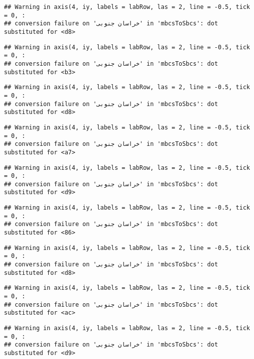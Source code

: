 \documentclass[
]{article}
\begin{document}
\begin{verbatim}
## Warning in axis(4, iy, labels = labRow, las = 2, line = -0.5, tick = 0, :
## conversion failure on 'خراسان جنوبی' in 'mbcsToSbcs': dot substituted for <d8>
\end{verbatim}

\begin{verbatim}
## Warning in axis(4, iy, labels = labRow, las = 2, line = -0.5, tick = 0, :
## conversion failure on 'خراسان جنوبی' in 'mbcsToSbcs': dot substituted for <b3>
\end{verbatim}

\begin{verbatim}
## Warning in axis(4, iy, labels = labRow, las = 2, line = -0.5, tick = 0, :
## conversion failure on 'خراسان جنوبی' in 'mbcsToSbcs': dot substituted for <d8>
\end{verbatim}

\begin{verbatim}
## Warning in axis(4, iy, labels = labRow, las = 2, line = -0.5, tick = 0, :
## conversion failure on 'خراسان جنوبی' in 'mbcsToSbcs': dot substituted for <a7>
\end{verbatim}

\begin{verbatim}
## Warning in axis(4, iy, labels = labRow, las = 2, line = -0.5, tick = 0, :
## conversion failure on 'خراسان جنوبی' in 'mbcsToSbcs': dot substituted for <d9>
\end{verbatim}

\begin{verbatim}
## Warning in axis(4, iy, labels = labRow, las = 2, line = -0.5, tick = 0, :
## conversion failure on 'خراسان جنوبی' in 'mbcsToSbcs': dot substituted for <86>
\end{verbatim}

\begin{verbatim}
## Warning in axis(4, iy, labels = labRow, las = 2, line = -0.5, tick = 0, :
## conversion failure on 'خراسان جنوبی' in 'mbcsToSbcs': dot substituted for <d8>
\end{verbatim}

\begin{verbatim}
## Warning in axis(4, iy, labels = labRow, las = 2, line = -0.5, tick = 0, :
## conversion failure on 'خراسان جنوبی' in 'mbcsToSbcs': dot substituted for <ac>
\end{verbatim}

\begin{verbatim}
## Warning in axis(4, iy, labels = labRow, las = 2, line = -0.5, tick = 0, :
## conversion failure on 'خراسان جنوبی' in 'mbcsToSbcs': dot substituted for <d9>
\end{verbatim}
\end{document}
